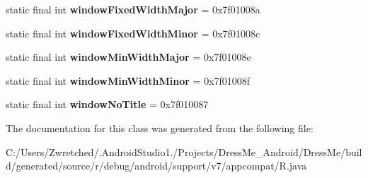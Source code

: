 \begin{DoxyCompactItemize}
\item 
\hypertarget{classandroid_1_1support_1_1v7_1_1appcompat_1_1_r_1_1attr_abb30020191b06391ce2c973b999e985a}{}static final int {\bfseries window\+Fixed\+Width\+Major} = 0x7f01008a\label{classandroid_1_1support_1_1v7_1_1appcompat_1_1_r_1_1attr_abb30020191b06391ce2c973b999e985a}

\item 
\hypertarget{classandroid_1_1support_1_1v7_1_1appcompat_1_1_r_1_1attr_aac53966a3b02d97f423d030e692e39fa}{}static final int {\bfseries window\+Fixed\+Width\+Minor} = 0x7f01008c\label{classandroid_1_1support_1_1v7_1_1appcompat_1_1_r_1_1attr_aac53966a3b02d97f423d030e692e39fa}

\item 
\hypertarget{classandroid_1_1support_1_1v7_1_1appcompat_1_1_r_1_1attr_a97b91d010aba26efc51cf5abef9717e1}{}static final int {\bfseries window\+Min\+Width\+Major} = 0x7f01008e\label{classandroid_1_1support_1_1v7_1_1appcompat_1_1_r_1_1attr_a97b91d010aba26efc51cf5abef9717e1}

\item 
\hypertarget{classandroid_1_1support_1_1v7_1_1appcompat_1_1_r_1_1attr_a42559736432f294a82fae05e842c36f6}{}static final int {\bfseries window\+Min\+Width\+Minor} = 0x7f01008f\label{classandroid_1_1support_1_1v7_1_1appcompat_1_1_r_1_1attr_a42559736432f294a82fae05e842c36f6}

\item 
\hypertarget{classandroid_1_1support_1_1v7_1_1appcompat_1_1_r_1_1attr_a46ea84cd8ac398f0d99f1ff7f0e2d100}{}static final int {\bfseries window\+No\+Title} = 0x7f010087\label{classandroid_1_1support_1_1v7_1_1appcompat_1_1_r_1_1attr_a46ea84cd8ac398f0d99f1ff7f0e2d100}

\end{DoxyCompactItemize}


The documentation for this class was generated from the following file\+:\begin{DoxyCompactItemize}
\item 
C\+:/\+Users/\+Zwretched/.\+Android\+Studio1./\+Projects/\+Dress\+Me\+\_\+\+Android/\+Dress\+Me/build/generated/source/r/debug/android/support/v7/appcompat/R.\+java\end{DoxyCompactItemize}
